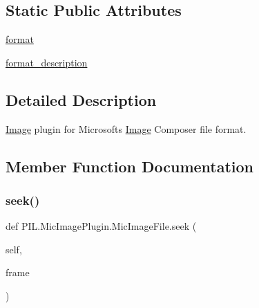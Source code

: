 \subsection*{Static Public Attributes}
\begin{DoxyCompactItemize}
\item 
\hyperlink{classPIL_1_1MicImagePlugin_1_1MicImageFile_aa2649b10421beaf87ea54094045d179d}{format}
\item 
\hyperlink{classPIL_1_1MicImagePlugin_1_1MicImageFile_a025a129dcb508ffa9c5410f33421bf2d}{format\+\_\+description}
\end{DoxyCompactItemize}


\subsection{Detailed Description}
\hyperlink{namespacePIL_1_1Image}{Image} plugin for Microsoft\textquotesingle{}s \hyperlink{namespacePIL_1_1Image}{Image} Composer file format. 



\subsection{Member Function Documentation}
\mbox{\label{classPIL_1_1MicImagePlugin_1_1MicImageFile_a2f2ac12b6b6e4bbe36722bc077e908f5}} 
\subsubsection{\texorpdfstring{seek()}{seek()}}
{\footnotesize\ttfamily def P\+I\+L.\+Mic\+Image\+Plugin.\+Mic\+Image\+File.\+seek (\begin{DoxyParamCaption}\item[{}]{self,  }\item[{}]{frame }\end{DoxyParamCaption})}

\mbox{\label{classPIL_1_1MicImagePlugin_1_1MicImageFile_a7a6b8dc54d3a9a0320122c30a9bab012}} 
